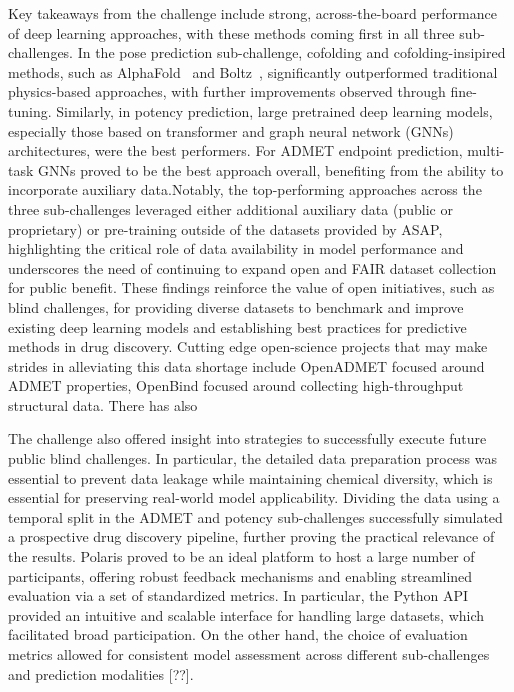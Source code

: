 \documentclass[journal=jcim,manuscript=article]{achemso}
\begin{document}
Key takeaways from the challenge include strong, across-the-board performance of deep learning approaches, with these methods coming first in all three sub-challenges. In the pose prediction sub-challenge, cofolding and cofolding-insipired methods, such as AlphaFold~\cite{} and Boltz~\cite{}, significantly outperformed traditional physics-based approaches, with further improvements observed through fine-tuning. Similarly, in potency prediction, large pretrained deep learning models, especially those based on transformer and graph neural network (GNNs) architectures, were the best performers. For ADMET endpoint prediction, multi-task GNNs proved to be the best approach overall, benefiting from the ability to incorporate auxiliary data.Notably, the top-performing approaches across the three sub-challenges leveraged either additional auxiliary data (public or proprietary) or pre-training outside of the datasets provided by ASAP, highlighting the critical role of data availability in model performance and underscores the need of continuing to expand open and FAIR dataset collection for public benefit. These findings reinforce the value of open initiatives, such as blind challenges, for providing diverse datasets to benchmark and improve existing deep learning models and establishing best practices for predictive methods in drug discovery. Cutting edge open-science projects that may make strides in alleviating this data shortage include OpenADMET focused around ADMET properties, OpenBind focused around collecting high-throughput structural data. There has also 

The challenge also offered insight into strategies to successfully execute future public blind challenges. In particular, the detailed data preparation process was essential to prevent data leakage while maintaining chemical diversity, which is essential for preserving real-world model applicability. Dividing the data using a temporal split in the ADMET and potency sub-challenges successfully simulated a prospective drug discovery pipeline, further proving the practical relevance of the results.
Polaris proved to be an ideal platform to host a large number of participants, offering robust feedback mechanisms and enabling streamlined evaluation via a set of standardized metrics. In particular, the Python API provided an intuitive and scalable interface for handling large datasets, which facilitated broad participation. On the other hand, the choice of evaluation metrics allowed for consistent model assessment across different sub-challenges and prediction modalities [??].
\end{document}
